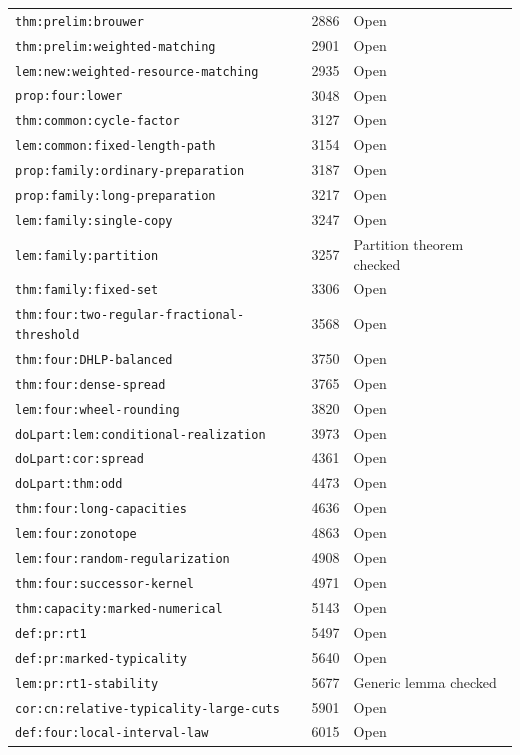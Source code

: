 \begin{tabular}{lll}
\nolinkurl{thm:prelim:brouwer} & 2886 & Open \\
\nolinkurl{thm:prelim:weighted-matching} & 2901 & Open \\
\nolinkurl{lem:new:weighted-resource-matching} & 2935 & Open \\
\nolinkurl{prop:four:lower} & 3048 & Open \\
\nolinkurl{thm:common:cycle-factor} & 3127 & Open \\
\nolinkurl{lem:common:fixed-length-path} & 3154 & Open \\
\nolinkurl{prop:family:ordinary-preparation} & 3187 & Open \\
\nolinkurl{prop:family:long-preparation} & 3217 & Open \\
\nolinkurl{lem:family:single-copy} & 3247 & Open \\
\nolinkurl{lem:family:partition} & 3257 & Partition theorem checked \\
\nolinkurl{thm:family:fixed-set} & 3306 & Open \\
\nolinkurl{thm:four:two-regular-fractional-threshold} & 3568 & Open \\
\nolinkurl{thm:four:DHLP-balanced} & 3750 & Open \\
\nolinkurl{thm:four:dense-spread} & 3765 & Open \\
\nolinkurl{lem:four:wheel-rounding} & 3820 & Open \\
\nolinkurl{doLpart:lem:conditional-realization} & 3973 & Open \\
\nolinkurl{doLpart:cor:spread} & 4361 & Open \\
\nolinkurl{doLpart:thm:odd} & 4473 & Open \\
\nolinkurl{thm:four:long-capacities} & 4636 & Open \\
\nolinkurl{lem:four:zonotope} & 4863 & Open \\
\nolinkurl{lem:four:random-regularization} & 4908 & Open \\
\nolinkurl{thm:four:successor-kernel} & 4971 & Open \\
\nolinkurl{thm:capacity:marked-numerical} & 5143 & Open \\
\nolinkurl{def:pr:rt1} & 5497 & Open \\
\nolinkurl{def:pr:marked-typicality} & 5640 & Open \\
\nolinkurl{lem:pr:rt1-stability} & 5677 & Generic lemma checked \\
\nolinkurl{cor:cn:relative-typicality-large-cuts} & 5901 & Open \\
\nolinkurl{def:four:local-interval-law} & 6015 & Open \\

\end{tabular}
